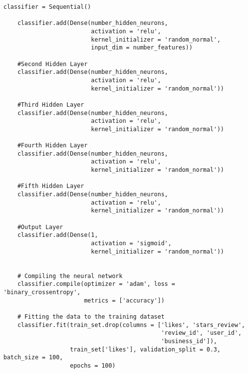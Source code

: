 \begin{lstlisting}[caption={Neural Network without dimensionality reduction},label={lst:nn-no-dim-red}]
    classifier = Sequential()
    
    classifier.add(Dense(number_hidden_neurons, 
                         activation = 'relu', 
                         kernel_initializer = 'random_normal', 
                         input_dim = number_features))
    
    #Second Hidden Layer
    classifier.add(Dense(number_hidden_neurons, 
                         activation = 'relu', 
                         kernel_initializer = 'random_normal'))
    
    #Third Hidden Layer
    classifier.add(Dense(number_hidden_neurons, 
                         activation = 'relu', 
                         kernel_initializer = 'random_normal'))

    #Fourth Hidden Layer
    classifier.add(Dense(number_hidden_neurons, 
                         activation = 'relu', 
                         kernel_initializer = 'random_normal'))
    
    #Fifth Hidden Layer
    classifier.add(Dense(number_hidden_neurons, 
                         activation = 'relu', 
                         kernel_initializer = 'random_normal'))
    
    #Output Layer
    classifier.add(Dense(1, 
                         activation = 'sigmoid', 
                         kernel_initializer = 'random_normal'))
    
    
    # Compiling the neural network
    classifier.compile(optimizer = 'adam', loss = 'binary_crossentropy',
                       metrics = ['accuracy'])
    
    # Fitting the data to the training dataset
    classifier.fit(train_set.drop(columns = ['likes', 'stars_review',
                                             'review_id', 'user_id', 
                                             'business_id']),
                   train_set['likes'], validation_split = 0.3, batch_size = 100,
                   epochs = 100)
\end{lstlisting}

